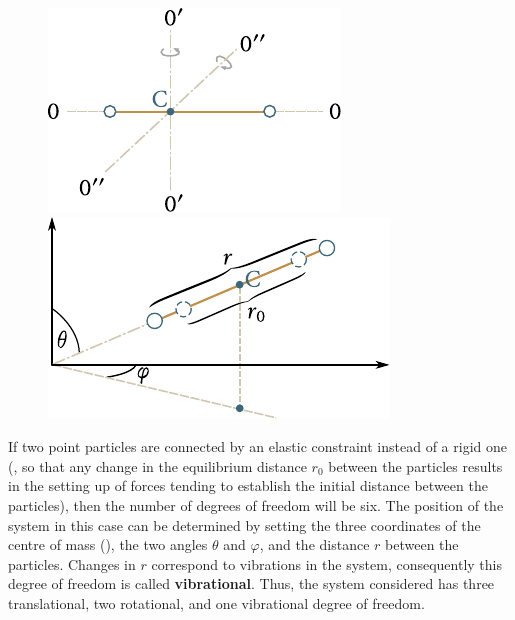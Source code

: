 \begin{figure}[t]
	\begin{minipage}[t]{0.5\linewidth}
		\begin{center}
			\includegraphics[scale=1.0]{figures/ch_11/fig_11_11.pdf}
			\caption[]{}
			\label{fig:11_11}
		\end{center}
	\end{minipage}
	\hspace{-0.05cm}
	\begin{minipage}[t]{0.5\linewidth}
		\begin{center}
			\includegraphics[scale=1.0]{figures/ch_11/fig_11_12.pdf}
			\caption[]{}
			\label{fig:11_12}
		\end{center}
	\end{minipage}
	\vspace{-0.4cm}
\end{figure}

If two point particles are connected by an elastic constraint instead of a rigid one (\ie, so that any change in the equilibrium distance $r_0$ between the particles results in the setting up of forces tending to establish the initial distance between the particles), then the number of degrees of freedom will be six. The position of the system in this case can be determined by setting the three coordinates of the centre of mass (), the two angles $\theta$ and $\varphi$, and the distance $r$ between the particles. Changes in $r$ correspond to vibrations in the system, consequently this degree of freedom is called \textbf{vibrational}. Thus, the system considered has three translational, two rotational, and one vibrational degree of freedom.

